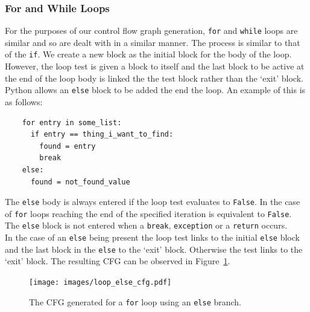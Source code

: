\documentclass[12pt, titlepage]{article}
\begin{document}
\subsubsection{For and While Loops}
For the purposes of our control flow graph generation, \texttt{for} and \texttt{while} loops are similar and so are dealt with in a similar manner. The process is similar to that of the \texttt{if}.  We create a new block as the initial block for the body of the loop. However, the loop test is given a block to itself and the last block to be active at the end of the loop body is linked the the test block rather than the `exit' block. \\
\indent Python allows an \texttt{else} block to be added the end the loop. An example of this is as follows:
\begin{lstlisting}
    for entry in some_list:
      if entry == thing_i_want_to_find:
        found = entry
        break
    else:
      found = not_found_value
\end{lstlisting}
The \texttt{else} body is always entered if the loop test evaluates to \texttt{False}. In the case of \texttt{for} loops reaching the end of the specified iteration is equivalent to \texttt{False}. The \texttt{else} block is not entered when a \texttt{break}, \texttt{exception} or a \texttt{return} occurs. \\
\indent In the case of an \texttt{else} being present the loop test links to the initial \texttt{else} block and the last block in the \texttt{else} to the `exit' block. Otherwise the test links to the `exit' block. The resulting CFG can be observed in Figure~\ref{fig:loopElseCFG}.

\begin{figure}
\centering
\texttt{[image: images/loop\_else\_cfg.pdf]}
\caption{The CFG generated for a \texttt{for} loop using an \texttt{else} branch.}
\label{fig:loopElseCFG}
\end{figure}
\end{document}
